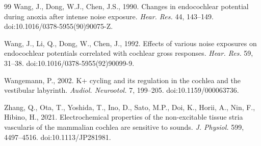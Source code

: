 \documentclass[final,5p,times]{elsarticle}
\begin{document}
\begin{thebibliography}{99}
Wang, J., Dong, W.J., Chen, J.S., 1990. Changes in endocochlear potential during anoxia after intense noise exposure. \emph{Hear. Res.} 44, 143--149. doi:10.1016/0378-5955(90)90075-Z.

Wang, J., Li, Q., Dong, W., Chen, J., 1992. Effects of various noise exposures on endocochlear potentials correlated with cochlear gross responses. \emph{Hear. Res.} 59, 31--38. doi:10.1016/0378-5955(92)90099-9.

Wangemann, P., 2002. K+ cycling and its regulation in the cochlea and the vestibular labyrinth. \emph{Audiol. Neurootol.} 7, 199--205. doi:10.1159/000063736.

Zhang, Q., Ota, T., Yoshida, T., Ino, D., Sato, M.P., Doi, K., Horii, A., Nin, F., Hibino, H., 2021. Electrochemical properties of the non-excitable tissue stria vascularis of the mammalian cochlea are sensitive to sounds. \emph{J. Physiol.} 599, 4497--4516. doi:10.1113/JP281981.

\end{thebibliography}
\end{document}
